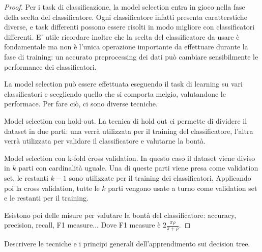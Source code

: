 \documentclass[12pt,a4paper,oneside]{book}
\begin{document}
\begin{proof}
	Per i task di classificazione, la model selection entra in gioco nella fase della scelta del classificatore. Ogni classificatore infatti presenta caratterstiche diverse, e task differenti possono essere risolti in modo migliore con classificatori differenti. E' utile ricordare inoltre che la scelta del classificatore da usare è fondamentale ma non è l'unica operazione importante da effettuare durante la fase di training: un accurato preprocessing dei dati può cambiare sensibilmente le performance dei classificatori.
	
	La model selection può essere effettuata eseguendo il task di learning su vari classificatori e scegliendo quello che si comporta melgio, valutandone le performace. Per fare ciò, ci sono diverse tecniche.
	
	Model selection con hold-out. La tecnica di hold out ci permette di dividere il dataset in due parti: una verrà utilizzata per il training del classificatore, l'altra verrà utilizzata per validare il classificatore e valutarne la bontà.
	
	Model selection con k-fold cross validation. In questo caso il dataset viene diviso in $k$ parti con cardinalità uguale. Una di queste parti viene presa come validation set, le restanti $k-1$ sono utilizzate per il training dei classificatori. Applicando poi la cross validation, tutte le $k$ parti vengono usate a turno come validation set e le restanti per il training.
	
	Esistono poi delle misure per valutare la bontà del classificatore: accuracy, precision, recall, F1 measure... Dove F1 measure è $2 \frac{\pi  \rho}{\pi + \rho}$.
\end{proof}

\begin{exercise}
	Descrivere le tecniche e i principi generali dell'apprendimento sui decision tree.
\end{exercise}
\end{document}
